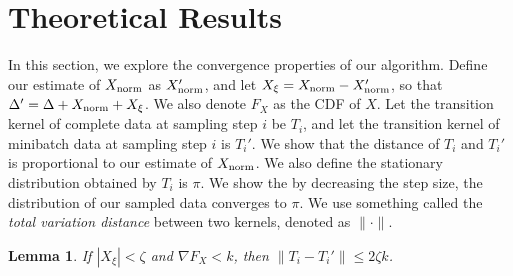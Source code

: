 \documentclass{article}
\newtheorem{lemma}{Lemma}
\begin{document}
\section{Theoretical Results}\label{sec:theory}

In this section, we explore the convergence properties of our algorithm.  Define our estimate of
$X_{\rm norm}$ as $X_{\rm norm}'$, and let $X_{\xi} = X_{\rm norm} - X_{\rm norm}'$, so that
$\Delta' = \Delta + X_{\rm norm} + X_\xi$.  We also denote $F_X$ as the CDF of $X$.  Let the
transition kernel of complete data at sampling step $i$ be $T_i$, and let the transition kernel of
minibatch data at sampling step $i$ is $T_i'$.  We show that the distance of $T_i$ and $T_i'$ is
proportional to our estimate of $X_{\rm norm}$. We also define the stationary distribution obtained
by $T_i$ is $\pi$.  We show the by decreasing the step size, the distribution of our sampled data
converges to $\pi$. We use something called the \emph{total variation distance} between two kernels,
denoted as $\| \cdot \|$.

\begin{lemma}
If $|X_\xi| < \zeta$ and $\nabla F_X < k$, then $\|T_i-T_i'\| \le 2\zeta k$.
\end{lemma}
\end{document}
